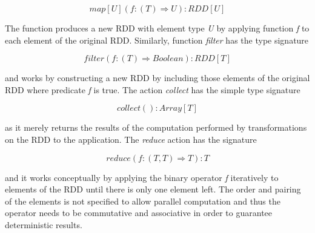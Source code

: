 \[map[U](f: (T) \Rightarrow U): RDD[U]\]

The function produces a new RDD with element type \textit{U} by applying function \textit{f} to each element of the original RDD. Similarly, function \textit{filter} has the type signature

\[filter(f: (T) \Rightarrow Boolean): RDD[T]\]

and works by constructing a new RDD by including those elements of the original RDD where predicate \textit{f} is true. The action \textit{collect} has the simple type signature 

\[collect(): Array[T]\]

as it merely returns the results of the computation performed by transformations on the RDD to the application. The \textit{reduce} action has the signature

\[reduce(f: (T, T) \Rightarrow T): T\]

and it works conceptually by applying the binary operator \textit{f} iteratively to elements of the RDD until there is only one element left. The order and pairing of the elements is not specified to allow parallel computation and thus the operator needs to be commutative and associative in order to guarantee deterministic results. 


